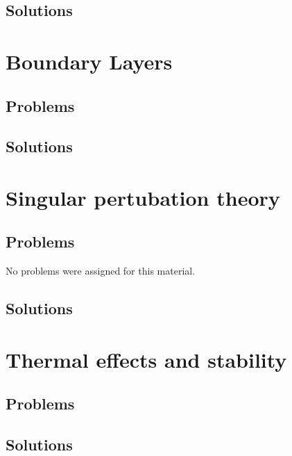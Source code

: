    \section{Solutions}
      \shipoutAnswer

\chapter{Boundary Layers}
   
   
   
   
   
   \section{Problems}
      
      
   \section{Solutions}
      \shipoutAnswer

\chapter{Singular pertubation theory}
   
   
   
   \section{Problems}
      No problems were assigned for this material.
   \section{Solutions}
      \shipoutAnswer

\chapter{Thermal effects and stability}
   
   
   
   \section{Problems}
      
   \section{Solutions}
      \shipoutAnswer

%
